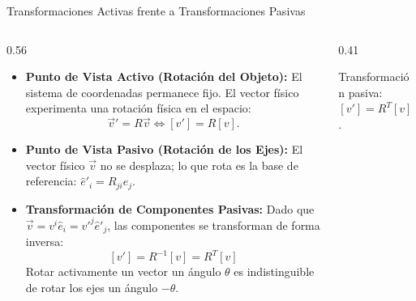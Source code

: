 \documentclass[10pt,aspectratio=169]{beamer}
\begin{document}
\begin{frame}{Transformaciones Activas frente a Transformaciones Pasivas}
  \begin{columns}[c]
    \begin{column}{0.56\textwidth}
      \footnotesize
      \begin{itemize}\itemsep2pt
        \item \textbf{Punto de Vista Activo (Rotación del Objeto):}
        El sistema de coordenadas permanece fijo. El vector físico experimenta una rotación física en el espacio:
        \[
        \vec{v}' = R\vec{v} \iff [v'] = R[v].
        \]
        \item \textbf{Punto de Vista Pasivo (Rotación de los Ejes):}
        El vector físico $\vec{v}$ no se desplaza; lo que rota es la base de referencia: $\hat{e}'_i = R_{ji}\hat{e}_j$.
        \item \textbf{Transformación de Componentes Pasivas:}
        Dado que $\vec{v} = v^i \hat{e}_i = v'^j \hat{e}'_j$, las componentes se transforman de forma inversa:
        \[
        \boxed{[v'] = R^{-1}[v] = R^T [v]}
        \]
        Rotar activamente un vector un ángulo $\theta$ es indistinguible de rotar los ejes un ángulo $-\theta$.
      \end{itemize}
    \end{column}
    \begin{column}{0.41\textwidth}
      \centering
      \vspace{0.15cm}
      {\scriptsize Transformación pasiva: $[v'] = R^T [v]$.}
    \end{column}
  \end{columns}
\end{frame}
\end{document}
